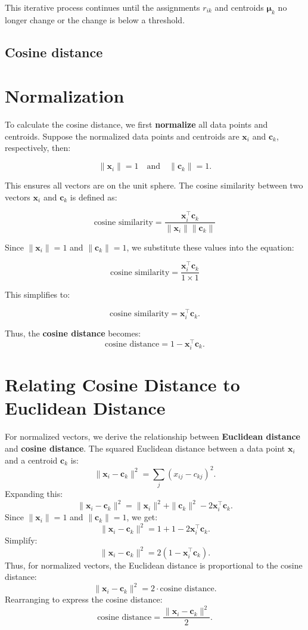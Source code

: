 This iterative process continues until the assignments \( r_{ik} \) and centroids \( \boldsymbol{\mu}_k \) no longer change or the change is below a threshold.

\subsection*{Cosine distance}

\section*{Normalization}

To calculate the cosine distance, we first \textbf{normalize} all data points and centroids. Suppose the normalized data points and centroids are \( \mathbf{x}_i \) and \( \mathbf{c}_k \), respectively, then:

\[
\|\mathbf{x}_i\| = 1 \quad \text{and} \quad \|\mathbf{c}_k\| = 1.
\]

This ensures all vectors are on the unit sphere. The cosine similarity between two vectors \( \mathbf{x}_i \) and \( \mathbf{c}_k \) is defined as:

\[
\text{cosine similarity} = \frac{\mathbf{x}_i^\top \mathbf{c}_k}{\|\mathbf{x}_i\| \|\mathbf{c}_k\|}
\]

Since \( \|\mathbf{x}_i\| = 1 \) and \( \|\mathbf{c}_k\| = 1 \), we substitute these values into the equation:

\[
\text{cosine similarity} = \frac{\mathbf{x}_i^\top \mathbf{c}_k}{1 \times 1}
\]

This simplifies to:

\[
\text{cosine similarity} = \mathbf{x}_i^\top \mathbf{c}_k.
\]

Thus, the \textbf{cosine distance} becomes:
\[
\text{cosine distance} = 1 - \mathbf{x}_i^\top \mathbf{c}_k.
\]

\section*{Relating Cosine Distance to Euclidean Distance}

For normalized vectors, we derive the relationship between \textbf{Euclidean distance} and \textbf{cosine distance}. The squared Euclidean distance between a data point \( \mathbf{x}_i \) and a centroid \( \mathbf{c}_k \) is:
\[
\|\mathbf{x}_i - \mathbf{c}_k\|^2 = \sum_{j} (x_{ij} - c_{kj})^2.
\]
Expanding this:
\[
\|\mathbf{x}_i - \mathbf{c}_k\|^2 = \|\mathbf{x}_i\|^2 + \|\mathbf{c}_k\|^2 - 2 \mathbf{x}_i^\top \mathbf{c}_k.
\]
Since \( \|\mathbf{x}_i\| = 1 \) and \( \|\mathbf{c}_k\| = 1 \), we get:
\[
\|\mathbf{x}_i - \mathbf{c}_k\|^2 = 1 + 1 - 2 \mathbf{x}_i^\top \mathbf{c}_k.
\]
Simplify:
\[
\|\mathbf{x}_i - \mathbf{c}_k\|^2 = 2(1 - \mathbf{x}_i^\top \mathbf{c}_k).
\]
Thus, for normalized vectors, the Euclidean distance is proportional to the cosine distance:
\[
\|\mathbf{x}_i - \mathbf{c}_k\|^2 = 2 \cdot \text{cosine distance}.
\]
Rearranging to express the cosine distance:
\[
\text{cosine distance} = \frac{\|\mathbf{x}_i - \mathbf{c}_k\|^2}{2}.
\]





